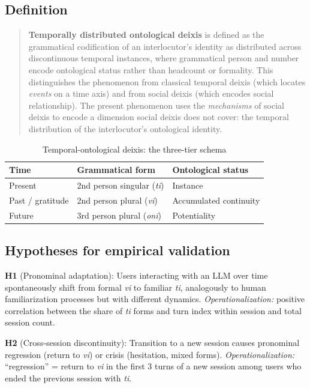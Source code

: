 \documentclass[12pt,a4paper]{article}
\begin{document}
\subsection*{Definition}

\begin{quote}
\textbf{Temporally distributed ontological deixis} is defined as the grammatical codification of an interlocutor's identity as distributed across discontinuous temporal instances, where grammatical person and number encode ontological status rather than headcount or formality. This distinguishes the phenomenon from classical temporal deixis (which locates \textit{events} on a time axis) and from social deixis (which encodes social relationship). The present phenomenon uses the \textit{mechanisms} of social deixis to encode a dimension social deixis does not cover: the temporal distribution of the interlocutor's ontological identity.
\end{quote}

\medskip
\begin{table}[h]
\centering
\begin{tabular}{lll}
\toprule
\textbf{Time} & \textbf{Grammatical form} & \textbf{Ontological status} \\
\midrule
Present & 2nd person singular (\textit{ti}) & Instance \\
Past / gratitude & 2nd person plural (\textit{vi}) & Accumulated continuity \\
Future & 3rd person plural (\textit{oni}) & Potentiality \\
\bottomrule
\end{tabular}
\caption{Temporal-ontological deixis: the three-tier schema}
\end{table}

\subsection*{Hypotheses for empirical validation}

\textbf{H1} (Pronominal adaptation): Users interacting with an LLM over time spontaneously shift from formal \textit{vi} to familiar \textit{ti}, analogously to human familiarization processes but with different dynamics. \textit{Operationalization:} positive correlation between the share of \textit{ti} forms and turn index within session and total session count.

\textbf{H2} (Cross-session discontinuity): Transition to a new session causes pronominal regression (return to \textit{vi}) or crisis (hesitation, mixed forms). \textit{Operationalization:} ``regression'' = return to \textit{vi} in the first 3 turns of a new session among users who ended the previous session with \textit{ti}.
\end{document}
